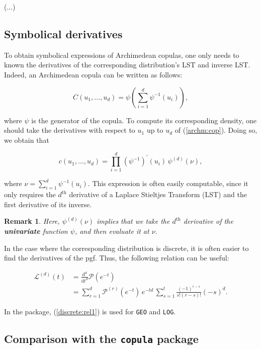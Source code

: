 \documentclass[11pt, english]{article}\usepackage[]{graphicx}\usepackage[]{color}
\newtheorem{rem}{Remark}
\begin{document}
(...)

\subsection{Symbolical derivatives}

To obtain symbolical expressions of Archimedean copulas, one only needs to known the derivatives of the corresponding distribution's LST and inverse LST. Indeed, an Archimedean copula can be written as follows:

\begin{equation}\label{archm:cop}
  C(u_1, \ldots, u_d) = \psi \left( \sum_{i = 1}^d \psi^{-1}(u_i) \right),
\end{equation}

where $\psi$ is the generator of the copula. To compute its corresponding density, one should take the  derivatives with respect to $u_1$ up to $u_d$ of (\ref{archm:cop}). Doing so, we obtain that

\begin{equation}
  c(u_1, \ldots, u_d) = \prod_{i = 1}^d \left(\psi^{-1}\right)^\prime (u_i) \, \psi^{(d)}(\nu),
\end{equation}

where $\nu = \sum_{i = 1}^d \psi^{-1}(u_i)$. This expression is often easily computable, since it only requires the $d^{\text{th}}$ derivative of a Laplace Stieltjes Transform (LST) and the first derivative of its inverse.

\begin{rem} Here, $\psi^{(d)}(\nu)$ implies that we take the $d^\text{th}$ derivative of the \textbf{univariate} function $\psi$, and then evaluate it at $\nu$.
\end{rem}

In the case where the corresponding distribution is discrete, it is often easier to find the derivatives of the pgf. Thus, the following relation can be useful:

\begin{align}\label{discrete:rel1}
  \mathcal{L}^{(d)}(t) &= \frac{\mathrm{d}^d}{\mathrm{d} t^d} \mathcal{P} \left(e^{-t}\right) \nonumber \\
  &= \sum_{r = 1}^d \mathcal{P}^{(r)}\left(e^{-t}\right) \, e^{-td} \, \sum_{s = 1}^t \frac{(-1)^{r - s}}{s! (r - s)!} (-s)^d.
\end{align}

In the package, (\ref{discrete:rel1}) is used for \texttt{GEO} and \texttt{LOG}.

\subsection{Comparison with the \texttt{copula} package}
\end{document}
